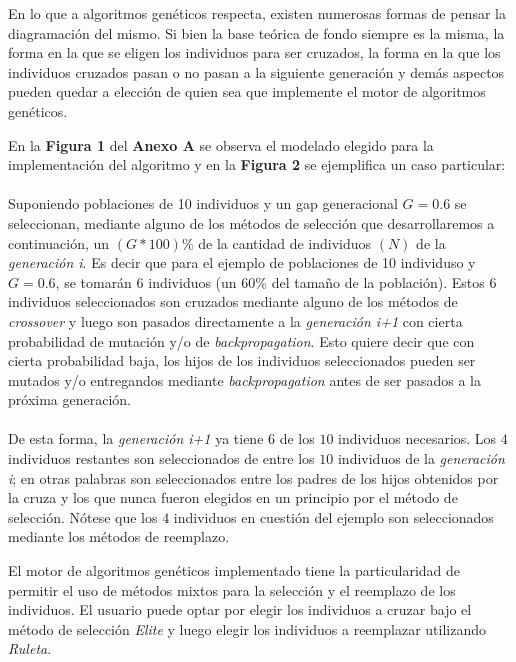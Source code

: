\documentclass[%
    final,
    reprint,
    notitlepage,
    narroweqnarray,
    inline,
    twoside,
    invited
    ]{ieee}
\begin{document}
\par En lo que a algoritmos genéticos respecta, existen numerosas formas de pensar la diagramación del mismo. Si bien la base teórica de fondo siempre es la misma, la forma en la que se eligen los individuos para ser cruzados, la forma en la que los individuos cruzados pasan o no pasan a la siguiente generación y demás aspectos pueden quedar a elección de quien sea que implemente el motor de algoritmos genéticos.\\
\par En la \textbf{Figura 1} del \textbf {Anexo A} se observa el modelado elegido para la implementación del algoritmo y en la \textbf{Figura 2} se ejemplifica un caso particular: \\\\
Suponiendo poblaciones de 10 individuos y un gap generacional $G = 0.6$ se seleccionan, mediante alguno de los métodos de selección que desarrollaremos a continuación, un $(G*100)\%$ de la cantidad de individuos $(N)$ de la \textit{generación i}. Es decir que para el ejemplo de poblaciones de 10 individuso y $G = 0.6$, se tomarán $6$ individuos (un $60\%$ del tamaño de la población). Estos $6$ individuos seleccionados son cruzados mediante alguno de los métodos de \textit{crossover} y luego son pasados directamente a la \textit{generación i+1} con cierta probabilidad de mutación y/o de \textit{backpropagation}. Esto quiere decir que con cierta probabilidad baja, los hijos de los individuos seleccionados pueden ser mutados y/o entregandos mediante \textit{backpropagation} antes de ser pasados a la próxima generación.\\\\
De esta forma, la \textit{generación i+1} ya tiene $6$ de los $10$ individuos necesarios. Los $4$ individuos restantes son seleccionados de entre los $10$ individuos de la \textit{generación i}; en otras palabras son seleccionados entre los padres de los hijos obtenidos por la cruza y los que nunca fueron elegidos en un principio por el método de selección. Nótese que los $4$ individuos en cuestión del ejemplo son seleccionados mediante los métodos de reemplazo.\\

\par El motor de algoritmos genéticos implementado tiene la particularidad de permitir el uso de métodos mixtos para la selección y el reemplazo de los individuos. El usuario puede optar por elegir los individuos a cruzar bajo el método de selección \textit{Elite} y luego elegir los individuos a reemplazar utilizando \textit{Ruleta}.
\end{document}
